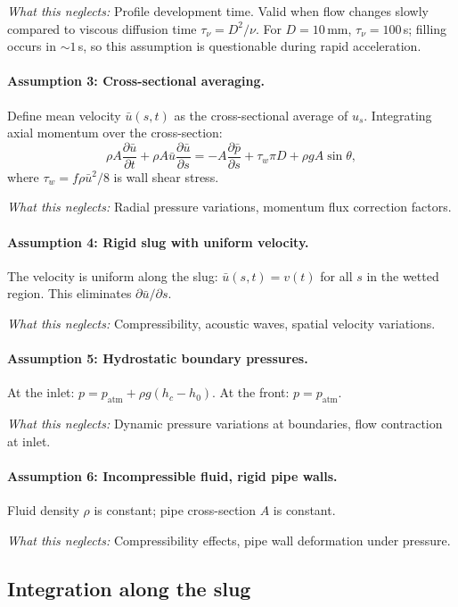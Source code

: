 \documentclass[11pt]{article}
\begin{document}
\emph{What this neglects:} Profile development time. Valid when flow changes slowly compared to viscous diffusion time $\tau_\nu = D^2/\nu$. For $D = 10$\,mm, $\tau_\nu = 100$\,s; filling occurs in $\sim 1$\,s, so this assumption is questionable during rapid acceleration.

\paragraph{Assumption 3: Cross-sectional averaging.}
Define mean velocity $\bar{u}(s,t)$ as the cross-sectional average of $u_s$. Integrating axial momentum over the cross-section:
\[
  \rho A \frac{\partial \bar{u}}{\partial t} + \rho A \bar{u}\frac{\partial \bar{u}}{\partial s} = -A\frac{\partial \bar{p}}{\partial s} + \tau_w \pi D + \rho g A \sin\theta,
\]
where $\tau_w = f\rho\bar{u}^2/8$ is wall shear stress.

\emph{What this neglects:} Radial pressure variations, momentum flux correction factors.

\paragraph{Assumption 4: Rigid slug with uniform velocity.}
The velocity is uniform along the slug: $\bar{u}(s,t) = v(t)$ for all $s$ in the wetted region. This eliminates $\partial\bar{u}/\partial s$.

\emph{What this neglects:} Compressibility, acoustic waves, spatial velocity variations.

\paragraph{Assumption 5: Hydrostatic boundary pressures.}
At the inlet: $p = p_{\text{atm}} + \rho g(h_c - h_0)$. At the front: $p = p_{\text{atm}}$.

\emph{What this neglects:} Dynamic pressure variations at boundaries, flow contraction at inlet.

\paragraph{Assumption 6: Incompressible fluid, rigid pipe walls.}
Fluid density $\rho$ is constant; pipe cross-section $A$ is constant.

\emph{What this neglects:} Compressibility effects, pipe wall deformation under pressure.

\subsection{Integration along the slug}
\end{document}
